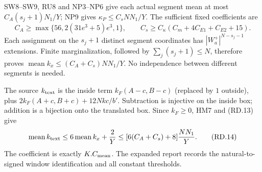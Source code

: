 SW8--SW9, RU8 and NP3--NP6 give each actual segment mean at most
$C_A(s_j+1)N_1/Y$; NP9 gives $\kappa_P\le C_sNN_1/Y$.
The sufficient fixed coefficients are
\[
 C_A\ge\max\{56,2(31e^3+5)e^3,1\},\qquad
 C_s\ge C_\kappa(C_m+4C_{E1}+C_{E2}+15).
\]
Each assignment on the $s_j+1$ distinct segment coordinates has
$|W_a^+|^{N-s_j-1}$ extensions. Finite marginalization, followed by
$\sum_j(s_j+1)\le N$, therefore proves
$\operatorname{mean}k_x\le(C_A+C_s)NN_1/Y$.
No independence between different segments is needed.

The source $k_{\rm text}$ is the inside term $k_F(A-c,B-c)$
(replaced by $1$ outside), plus $2k_F(A+c,B+c)+12Nkc/b'$.
Subtraction is injective on the inside box; addition is a bijection
onto the translated box. Since $k_F\ge0$, HM7 and (RD.13) give
\[
 \operatorname{mean}k_{\rm text}
 \le6\operatorname{mean}k_x+\frac2Y
 \le[6(C_A+C_s)+8]\frac{NN_1}{Y}.
 \tag{RD.14}
\]
The coefficient is exactly $K.C_{\rm mean}$. The expanded report records
the natural-to-signed window identification and all constant thresholds.
